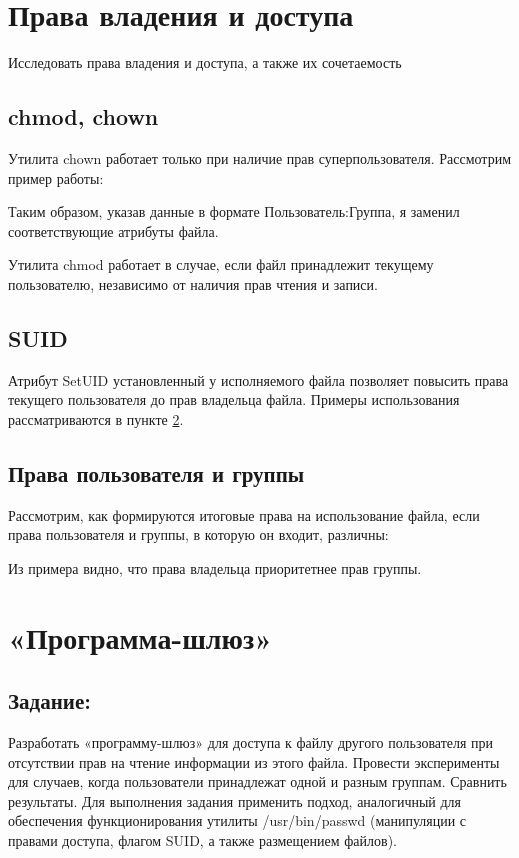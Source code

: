 \documentclass[a4paper]{article}
\begin{document}
\section{Права владения и доступа} Исследовать права владения и доступа, а также их сочетаемость
\subsection{chmod, chown} Утилита chown работает только при наличие прав суперпользователя. Рассмотрим пример работы:

Таким образом, указав данные в формате Пользователь:Группа, я заменил соответствующие атрибуты файла.\\
\par Утилита chmod работает в случае, если файл принадлежит текущему пользователю, независимо от наличия прав чтения и записи.

\subsection{SUID} Атрибут SetUID установленный у исполняемого файла позволяет повысить права текущего пользователя до прав владельца файла. Примеры использования рассматриваются в пункте \ref{getaway}.
\subsection{ Права пользователя и группы} Рассмотрим, как формируются итоговые права на использование файла, если права пользователя и группы, в которую он входит, различны:

Из примера видно, что права владельца приоритетнее прав группы.

\section{«Программа-шлюз» } \label{getaway}
\subsection{Задание:} Разработать «программу-шлюз» для доступа к файлу другого пользователя при отсутствии прав на чтение информации из этого файла. Провести эксперименты для случаев, когда пользователи принадлежат одной и разным группам. Сравнить результаты. Для выполнения задания применить подход, аналогичный для обеспечения функционирования утилиты /usr/bin/passwd (манипуляции с правами доступа, флагом SUID, а также размещением файлов).
\end{document}
